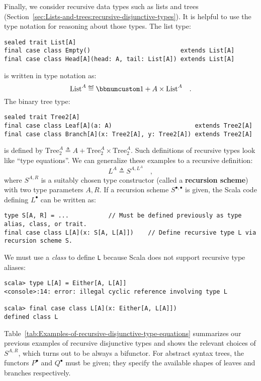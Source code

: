 Finally, we consider recursive data types such as lists and trees
(Section~\ref{sec:Lists-and-trees:recursive-disjunctive-types}).
It is helpful to use the type notation for reasoning about those types.
The list type:
\begin{lstlisting}
sealed trait List[A]
final case class Empty()                         extends List[A]
final case class Head[A](head: A, tail: List[A]) extends List[A]
\end{lstlisting}
is written in type notation as:
\[
\text{List}^{A}\triangleq\bbnum 1+A\times\text{List}^{A}\quad.
\]
The binary tree type:
\begin{lstlisting}
sealed trait Tree2[A]
final case class Leaf[A](a: A)                       extends Tree2[A]
final case class Branch[A](x: Tree2[A], y: Tree2[A]) extends Tree2[A]
\end{lstlisting}
is defined by $\text{Tree}_{2}^{A}\triangleq A+\text{Tree}_{2}^{A}\times\text{Tree}_{2}^{A}$.
Such definitions of recursive types look like \textsf{``}type equations\textsf{''}.
We can generalize these examples to a recursive definition:
\begin{equation}
L^{A}\triangleq S^{A,L^{A}}\quad,\label{eq:f-def-recursive-functor}
\end{equation}
where $S^{A,R}$ is a suitably chosen type constructor (called a \textbf{recursion
scheme}) with two type parameters $A,R$. If a recursion scheme $S^{\bullet,\bullet}$
is given, the Scala code defining $L^{\bullet}$ can be written as:
\begin{lstlisting}
type S[A, R] = ...           // Must be defined previously as type alias, class, or trait.
final case class L[A](x: S[A, L[A]])    // Define recursive type L via recursion scheme S.
\end{lstlisting}
We must use a \emph{class} to define \lstinline!L! because Scala
does not support recursive type aliases:
\begin{lstlisting}
scala> type L[A] = Either[A, L[A]]
<console>:14: error: illegal cyclic reference involving type L

scala> final case class L[A](x: Either[A, L[A]])
defined class L
\end{lstlisting}

Table~\ref{tab:Examples-of-recursive-disjunctive-type-equations}
summarizes our previous examples of recursive disjunctive types and
shows the relevant choices of $S^{A,R}$, which turns out to be always
a bifunctor. For abstract syntax trees, the functors $P^{\bullet}$
and $Q^{\bullet}$ must be given; they specify the available shapes
of leaves and branches respectively. 

